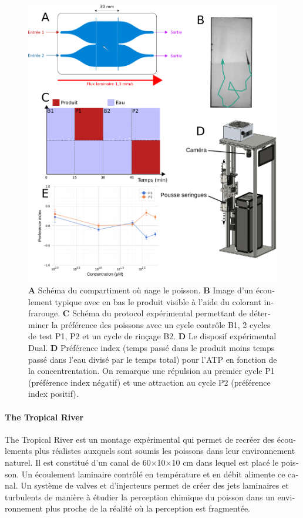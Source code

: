 \begin{otherlanguage}{french}
    \begin{figure}[h!]
      \centering
      \includegraphics[width=1\textwidth]{part_2/assets/resume1.png}
      \caption{\textbf{A} Schéma du compartiment où nage le poisson. \textbf{B} Image d'un écoulement typique avec en bas le produit visible à l'aide du colorant infrarouge. \textbf{C} Schéma du protocol expérimental permettant de déterminer la préférence des poissons avec un cycle contrôle B1, 2 cycles de test P1, P2 et un cycle de rinçage B2. \textbf{D} Le disposif expérimental Dual. \textbf{D} Préférence index (temps passé dans le produit moins temps passé dans l'eau divisé par le temps total) pour l'ATP en fonction de la concentrentation. On remarque une répulsion au premier cycle P1 (préférence index négatif) et une attraction au cycle P2 (préférence index positif).}
      \label{}
    \end{figure}

\paragraph{The Tropical River} The Tropical River est un montage expérimental qui permet de recréer des écoulements plus réalistes auxquels sont soumis les poissons dans leur environnement naturel. Il est constitué d'un canal de 60×10×10 cm dans lequel est placé le poisson. Un écoulement laminaire contrôlé en température et en débit alimente ce canal. Un système de valves et d'injecteurs permet de créer des jets laminaires et turbulents de manière à étudier la perception chimique du poisson dans un environnement plus proche de la réalité où la perception est fragmentée.


\end{otherlanguage}
